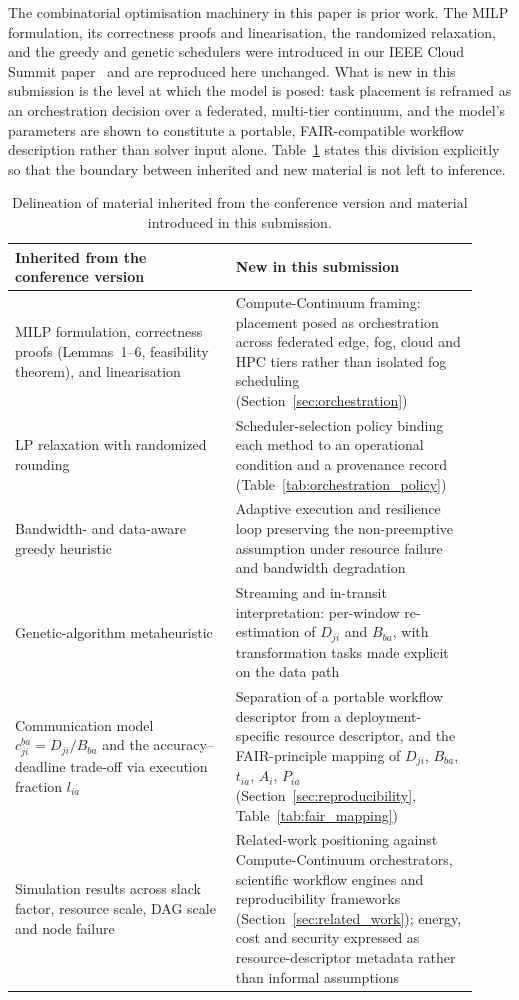 The combinatorial optimisation machinery in this paper is prior work. The MILP
formulation, its correctness proofs and linearisation, the randomized relaxation, and the greedy
and genetic schedulers were introduced in our IEEE Cloud Summit paper~\cite{gupta2025efficient}
and are reproduced here unchanged. What is new in this submission is the level at which the model
is posed: task placement is reframed as an orchestration decision over a federated, multi-tier
continuum, and the model's parameters are shown to constitute a portable, FAIR-compatible workflow
description rather than solver input alone. Table~\ref{tab:novelty} states this division explicitly
so that the boundary between inherited and new material is not left to inference.

\begin{table}[t]
\centering
\caption{Delineation of material inherited from the conference version and material introduced in
this submission.}
\label{tab:novelty}
\small
\begin{tabular}{p{0.44\linewidth}p{0.48\linewidth}}
\toprule
\textbf{Inherited from the conference version} & \textbf{New in this submission} \\
\midrule
MILP formulation, correctness proofs (Lemmas~1--6, feasibility theorem), and linearisation &
Compute-Continuum framing: placement posed as orchestration across federated edge, fog, cloud and
HPC tiers rather than isolated fog scheduling (Section~\ref{sec:orchestration}) \\
\addlinespace
LP relaxation with randomized rounding &
Scheduler-selection policy binding each method to an operational condition and a provenance record
(Table~\ref{tab:orchestration_policy}) \\
\addlinespace
Bandwidth- and data-aware greedy heuristic &
Adaptive execution and resilience loop preserving the non-preemptive assumption under resource
failure and bandwidth degradation \\
\addlinespace
Genetic-algorithm metaheuristic &
Streaming and in-transit interpretation: per-window re-estimation of $D_{ji}$ and $B_{ba}$, with
transformation tasks made explicit on the data path \\
\addlinespace
Communication model $c_{ji}^{ba}=D_{ji}/B_{ba}$ and the accuracy--deadline trade-off via execution
fraction $l_{ia}$ &
Separation of a portable workflow descriptor from a deployment-specific resource descriptor, and
the FAIR-principle mapping of $D_{ji}$, $B_{ba}$, $t_{ia}$, $A_i$, $P_{ia}$
(Section~\ref{sec:reproducibility}, Table~\ref{tab:fair_mapping}) \\
\addlinespace
Simulation results across slack factor, resource scale, DAG scale and node failure &
Related-work positioning against Compute-Continuum orchestrators, scientific workflow engines and
reproducibility frameworks (Section~\ref{sec:related_work}); energy, cost and security expressed as
resource-descriptor metadata rather than informal assumptions \\
\bottomrule
\end{tabular}
\end{table}

